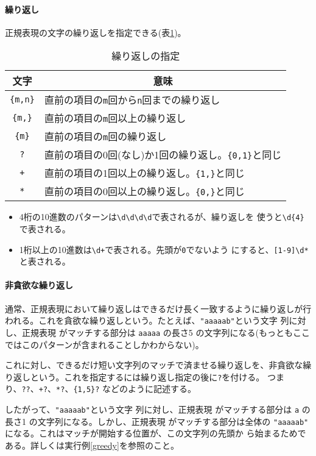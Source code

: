 \paragraph{繰り返し}
正規表現の文字の繰り返しを指定できる(表\ref{repeat})。
\begin{table}[ht]
\caption{繰り返しの指定}\label{repeat}
\begin{center}
 \begin{tabular}{|c|l|}\hline
  文字&\multicolumn{1}{c|}{意味}\\\hline
\Verb+{m,n}+&直前の項目の\texttt{m}回から\texttt{n}回までの繰り返し\\\hline
\Verb+{m,}+&直前の項目の\texttt{m}回以上の繰り返し\\\hline
\Verb+{m}+&直前の項目の\texttt{m}回の繰り返し\\\hline
\Verb+?+&直前の項目の0回(なし)か1回の繰り返し。\Verb+{0,1}+と同じ\\\hline
\Verb-+-&直前の項目の1回以上の繰り返し。\Verb+{1,}+と同じ\\\hline
\Verb+*+&直前の項目の0回以上の繰り返し。\Verb+{0,}+と同じ\\\hline
\end{tabular}
\end{center}
\end{table}
\begin{itemize}
 \item 4桁の10進数のパターンは\Verb+\d\d\d\d+で表されるが、繰り返しを
       使うと\Verb+\d{4}+で表される。
 \item 1桁以上の10進数は\Verb-\d+-で表される。先頭が\texttt{0}でないよう
       にすると、\Verb+[1-9]\d*+と表される。
\end{itemize}
\paragraph{非貪欲な繰り返し}
通常、正規表現において繰り返しはできるだけ長く一致するように繰り返しが行
われる。これを貪欲な繰り返しという。たとえば、\Verb+"aaaaab"+という文字
列に対し、正規表現  がマッチする部分は \Verb+aaaaa+ の長さ5
の文字列になる(もっともここではこのパターンが含まれることしかわからない)。

これに対し、できるだけ短い文字列のマッチで済ませる繰り返しを、非貪欲な繰
り返しという。これを指定するには繰り返し指定の後に\Verb+?+を付ける。
つまり、\Verb-??-、\Verb-+?-、\Verb-*?-、\Verb-{1,5}?- などのように記述する。

したがって、\Verb+"aaaaab"+という文字
列に対し、正規表現  がマッチする部分は \Verb+a+ の長さ1
の文字列になる。しかし、正規表現  がマッチする部分は全体の
\Verb+"aaaaab"+ になる。これはマッチが開始する位置が、この文字列の先頭か
ら始まるためである。詳しくは実行例\ref{greedy}を参照のこと。

